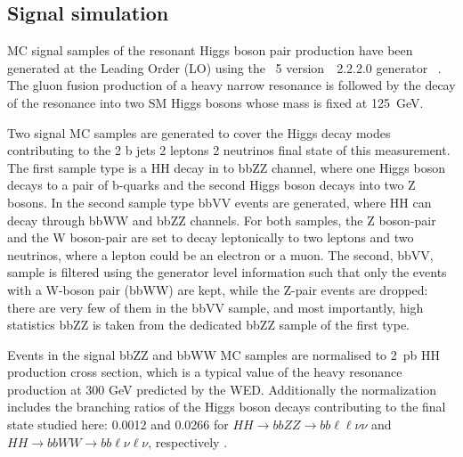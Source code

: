 

\subsection{Signal simulation\label{sec:signalMC}}

MC signal samples of the resonant Higgs boson pair production have been generated at the Leading Order (LO) using the \MADGRAPH~5 version\ ~2.2.2.0  generator ~\cite{Alwall:2014hca}. The gluon fusion production of a heavy narrow resonance is followed by the decay of the resonance into two SM Higgs bosons whose mass is fixed at 125~GeV.

Two signal MC samples are generated to cover the Higgs decay modes contributing to the 2 b jets 2 leptons 2 neutrinos final state of this measurement. The first sample type is a HH decay in to bbZZ channel, where one Higgs boson decays to a pair of b-quarks and the second Higgs boson decays into two Z bosons. In the second sample type bbVV events are generated, where HH can decay through bbWW and bbZZ channels. For both samples, the Z boson-pair and the W boson-pair are set to decay leptonically to two leptons and two neutrinos, where a lepton could be an electron or a muon. The second, bbVV, sample is filtered using the generator level information such that only the events with a W-boson pair (bbWW) are kept, while the Z-pair events are dropped: there are very few of them in the bbVV sample, and most importantly, high statistics bbZZ is taken from the dedicated bbZZ sample of the first type.

Events in the signal bbZZ and bbWW MC samples are normalised to 2~pb HH production cross section, which is a typical value of the heavy resonance production at 300 GeV predicted by the WED. Additionally the normalization includes the branching ratios of the Higgs boson decays contributing to the final state studied here: 0.0012 and 0.0266 for $HH\to bbZZ\to bb\ell\ell\nu\nu$ and $HH\to bbWW\to bb\ell\nu\ell\nu$, respectively \cite{CERNYR4}.


